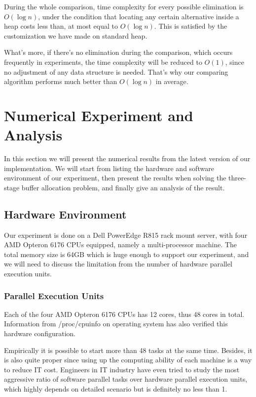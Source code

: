 \documentclass[12pt,a4paper]{report}
\begin{document}
During the whole comparison, time complexity for every possible elimination is $O(\log n)$, under the condition that locating any certain alternative inside a heap costs less than, at most equal to $O(\log n)$. This is satisfied by the customization we have made on standard heap.

What's more, if there's no elimination during the comparison, which occurs frequently in experiments, the time complexity will be reduced to $O(1)$, since no adjustment of any data structure is needed. That's why our comparing algorithm performs much better than $O(\log n)$ in average.

\chapter{Numerical Experiment and Analysis}

In this section we will present the numerical results from the latest version of our implementation. We will start from listing the hardware and software environment of our experiment, then present the results when solving the three-stage buffer allocation problem, and finally give an analysis of the result.

\section{Hardware Environment}

Our experiment is done on a Dell PowerEdge R815 rack mount server, with four AMD Opteron 6176 CPUs equipped, namely a multi-processor machine. The total memory size is 64GB which is huge enough to support our experiment, and we will need to discuss the limitation from the number of hardware parallel execution units.

\subsection{Parallel Execution Units}

Each of the four AMD Opteron 6176 CPUs has 12 cores, thus 48 cores in total. Information from /proc/cpuinfo on operating system has also verified this hardware configuration.

Empirically it is possible to start more than 48 tasks at the same time. Besides, it is also quite proper since using up the computing ability of each machine is a way to reduce IT cost. Engineers in IT industry have even tried to study the most aggressive ratio of software parallel tasks over hardware parallel execution units, which highly depends on detailed scenario but is definitely no less than 1.
\end{document}
